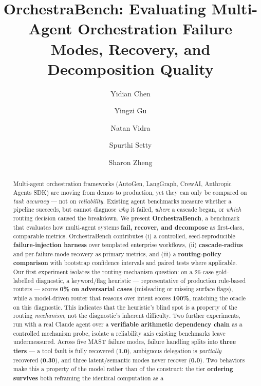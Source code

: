 \documentclass[sigconf,nonacm,anonymous]{acmart}  %
\begin{document}
\title{OrchestraBench: Evaluating Multi-Agent Orchestration Failure
Modes, Recovery, and Decomposition Quality}

\author{Yidian Chen}
\author{Yingzi Gu}
\author{Natan Vidra}
\author{Spurthi Setty}
\author{Sharon Zheng}

\begin{abstract}
Multi-agent orchestration frameworks (AutoGen, LangGraph, CrewAI, Anthropic
Agents SDK) are moving from demos to production, yet they can only be compared
on \emph{task accuracy} --- not on \emph{reliability}. Existing agent benchmarks
measure whether a pipeline succeeds, but cannot diagnose \emph{why} it failed,
\emph{where} a cascade began, or \emph{which} routing decision caused the
breakdown. We present \textbf{OrchestraBench}, a benchmark that evaluates
how multi-agent systems \textbf{fail, recover, and decompose} as first-class,
comparable metrics. OrchestraBench contributes (i) a controlled,
seed-reproducible \textbf{failure-injection harness} over templated enterprise
workflows, (ii) \textbf{cascade-radius} and per-failure-mode recovery as primary
metrics, and (iii) a \textbf{routing-policy comparison} with bootstrap
confidence intervals and paired tests where applicable. Our first experiment
isolates the routing-mechanism question: on a
26-case gold-labelled diagnostic, a keyword/flag heuristic --- representative of
production rule-based routers --- scores \textbf{0\% on adversarial cases}
(misleading or missing surface flags), while a model-driven router that reasons
over intent scores \textbf{100\%}, matching the oracle on this diagnostic.
This indicates that the heuristic's blind spot is a property of the routing
\emph{mechanism}, not the diagnostic's inherent difficulty. Two further
experiments, run with a real Claude agent over a \textbf{verifiable arithmetic
dependency chain} as a controlled mechanism probe, isolate a reliability axis
existing benchmarks leave undermeasured. Across five MAST failure modes, failure
handling splits into \textbf{three tiers} --- a tool fault is fully recovered
(\textbf{1.0}), ambiguous delegation is \emph{partially} recovered
(\textbf{0.30}), and three latent/semantic modes never recover (\textbf{0.0}).
Two behaviors make this a property of the model rather than of the construct:
the tier \textbf{ordering survives} both reframing the identical computation as a

\end{abstract}
\end{document}

